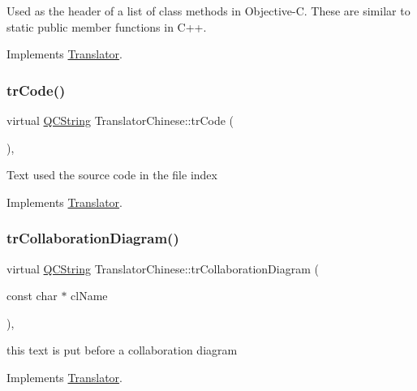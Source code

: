 Used as the header of a list of class methods in Objective-\/C. These are similar to static public member functions in C++. 

Implements \mbox{\hyperlink{class_translator}{Translator}}.

\mbox{\label{class_translator_chinese_aa8465ab632d130bec3c387ebea46a42a}} 
\subsubsection{\texorpdfstring{trCode()}{trCode()}}
{\footnotesize\ttfamily virtual \mbox{\hyperlink{class_q_c_string}{Q\+C\+String}} Translator\+Chinese\+::tr\+Code (\begin{DoxyParamCaption}{ }\end{DoxyParamCaption})\hspace{0.3cm}{\ttfamily [inline]}, {\ttfamily [virtual]}}

Text used the source code in the file index 

Implements \mbox{\hyperlink{class_translator}{Translator}}.

\mbox{\label{class_translator_chinese_acf42cb648e0de551913b17331dfa5eb4}} 
\subsubsection{\texorpdfstring{trCollaborationDiagram()}{trCollaborationDiagram()}}
{\footnotesize\ttfamily virtual \mbox{\hyperlink{class_q_c_string}{Q\+C\+String}} Translator\+Chinese\+::tr\+Collaboration\+Diagram (\begin{DoxyParamCaption}\item[{const char $\ast$}]{cl\+Name }\end{DoxyParamCaption})\hspace{0.3cm}{\ttfamily [inline]}, {\ttfamily [virtual]}}

this text is put before a collaboration diagram 

Implements \mbox{\hyperlink{class_translator}{Translator}}.

\mbox{\label{class_translator_chinese_a4b4771837d68a9d9aa2f4950d0e05c82}} 
